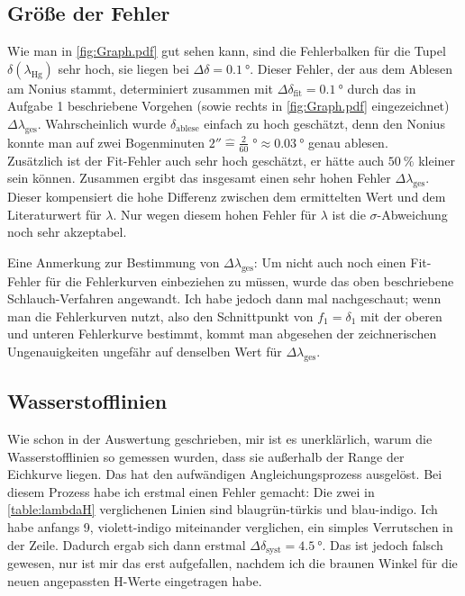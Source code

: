 \subsection{Größe der Fehler}
Wie man in \cref{fig:Graph.pdf} gut sehen kann, sind die Fehlerbalken für die Tupel \(\delta (\lambda_{\text{Hg}})\) sehr hoch, sie liegen bei \(\Delta \delta=\qty{0,1}{\degree}\). Dieser Fehler, der aus dem Ablesen am Nonius stammt, determiniert zusammen mit \(\Delta \delta_{\text{fit}}=\qty{0,1}{\degree}\) durch das in Aufgabe 1 beschriebene Vorgehen (sowie rechts in \cref{fig:Graph.pdf} eingezeichnet) \(\Delta \lambda_{\text{ges}}\). Wahrscheinlich wurde \(\delta_{\text{ablese}}\) einfach zu hoch geschätzt, denn den Nonius konnte man auf zwei Bogenminuten \(\ang{;;2} \mathrel{\widehat{=}} \tfrac{2}{60}\;\unit{\degree} \approx \qty{0,03}{\degree}\) genau ablesen.\\
Zusätzlich ist der Fit-Fehler auch sehr hoch geschätzt, er hätte auch \(\qty{50}{\percent}\) kleiner sein können. Zusammen ergibt das insgesamt einen sehr hohen Fehler \(\Delta \lambda_{\text{ges}}\). Dieser kompensiert die hohe Differenz zwischen dem ermittelten Wert und dem Literaturwert für \(\lambda\). Nur wegen diesem hohen Fehler für \(\lambda\) ist die \(\sigma\)-Abweichung noch sehr akzeptabel.

Eine Anmerkung zur Bestimmung von \(\Delta \lambda_{\text{ges}}\): Um nicht auch noch einen Fit-Fehler für die Fehlerkurven einbeziehen zu müssen, wurde das oben beschriebene Schlauch-Verfahren angewandt. Ich habe jedoch dann mal nachgeschaut; wenn man die Fehlerkurven nutzt, also den Schnittpunkt von \(f_1=\delta_1\) mit der oberen und unteren Fehlerkurve bestimmt, kommt man abgesehen der zeichnerischen Ungenauigkeiten ungefähr auf denselben Wert für \(\Delta \lambda_{\text{ges}}\).

\subsection{Wasserstofflinien}
Wie schon in der Auswertung geschrieben, mir ist es unerklärlich, warum die Wasserstofflinien so gemessen wurden, dass sie außerhalb der Range der Eichkurve liegen. Das hat den aufwändigen Angleichungsprozess ausgelöst. Bei diesem Prozess habe ich erstmal einen Fehler gemacht: Die zwei in \cref{table:lambdaH} verglichenen Linien sind blaugrün-türkis und blau-indigo. Ich habe anfangs 9, violett-indigo miteinander verglichen, ein simples Verrutschen in der Zeile. Dadurch ergab sich dann erstmal \(\Delta \delta_{\text{syst}}=\qty{4,5}{\degree}\). Das ist jedoch falsch gewesen, nur ist mir das erst aufgefallen, nachdem ich die braunen Winkel für die neuen angepassten H-Werte eingetragen habe.


